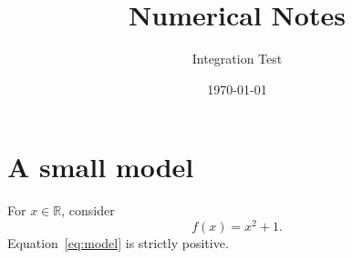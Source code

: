 \documentclass{article}
\title{Numerical Notes}
\author{Integration Test}
\date{\today}
\begin{document}
\maketitle
\tableofcontents



\section{A small model}
For $x \in \mathbb{R}$, consider
\begin{equation}
  f(x) = x^2 + 1.
  \label{eq:model}
\end{equation}
Equation~\eqref{eq:model} is strictly positive.
\end{document}
